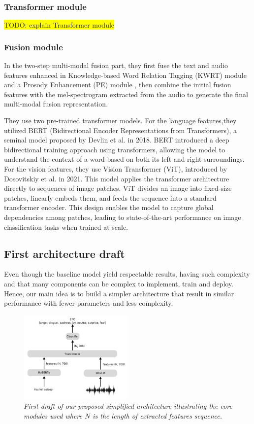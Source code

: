 \documentclass{article}
\begin{document}
\subsubsection{Transformer module}
\colorbox{yellow}{TODO: explain Transformer module}\\


\subsubsection{Fusion module}
In the two-step multi-modal fusion part, they first
fuse the text and audio features enhanced in Knowledge-based Word
Relation Tagging (KWRT) module and a Prosody Enhancement (PE) module , then combine the initial fusion features with the mel-spectrogram extracted from the audio to generate the final multi-modal fusion representation.

They use two pre-trained transformer models. For the language features,they utilized BERT (Bidirectional Encoder Representations from Transformers), a seminal model proposed by Devlin et al. in 2018. BERT introduced a deep bidirectional training approach using transformers, allowing the model to understand the context of a word based on both its left and right surroundings. 
For the vision features, they use Vision Transformer (ViT), introduced by Dosovitskiy et al. in 2021. This model  applies the transformer architecture directly to sequences of image patches. ViT divides an image into fixed-size patches, linearly embeds them, and feeds the sequence into a standard transformer encoder. This design enables the model to capture global dependencies among patches, leading to state-of-the-art performance on image classification tasks when trained at scale. 

\subsection{First architecture draft}
Even though the baseline model yield respectable results, having such complexity and that many components can be complex to implement, train and deploy. Hence, our main idea is to build a simpler architecture that result in similar performance with fewer parameters and less complexity.

\begin{figure}[htbp]
  \centering
  \includegraphics[width=0.5\textwidth]{Images/architecture_draft.png}
  \caption{\textit{First draft of our proposed simplified architecture illustrating the core modules used where $N$ is the length of extracted features sequence.}}
  \label{fig:DraftArchitecture}
\end{figure}
\end{document}
